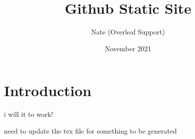 \documentclass{article}
\title{Github Static Site}
\author{Nate (Overleaf Support)}
\date{November 2021}
\begin{document}
\maketitle

\section{Introduction}

i will it to work!

need to update the tex file for something to be generated
\end{document}
